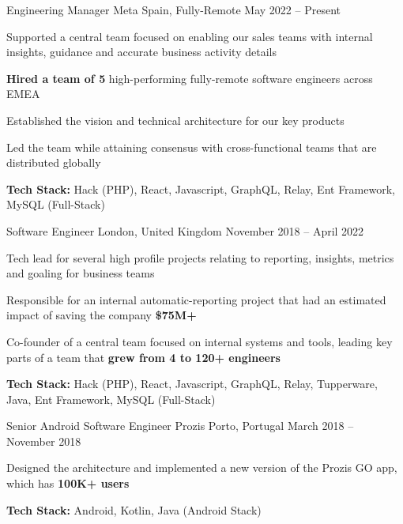 \documentclass[]{awesome-cv}
\begin{document}
	
\vspace{-8mm}
\begin{cventries}

\vspace{-2mm}

\cventry
	{Engineering Manager}
	{Meta}
	{Spain, Fully-Remote}
	{May 2022 – Present}
	{\begin{cvitems}
		\item {Supported a central team focused on enabling our sales teams with internal insights, guidance and accurate business activity details}
		\item {\textbf{Hired a team of 5} high-performing fully-remote software engineers across EMEA}
		\item {Established the vision and technical architecture for our key products}
		\item {Led the team while attaining consensus with cross-functional teams that are distributed globally}
		\item {\textbf{Tech Stack:} Hack (PHP), React, Javascript, GraphQL, Relay, Ent Framework, MySQL (Full-Stack)}
	\end{cvitems}}


	\vspace{-9mm}
	\cventry
	{Software Engineer}
	{}
	{London, United Kingdom}
	{November 2018 – April 2022}
	{\begin{cvitems}
		\item {Tech lead for several high profile projects relating to reporting, insights, metrics and goaling for business teams}
		\item {Responsible for an internal automatic-reporting project that had an estimated impact of saving the company  \textbf{\$75M+}}
		\item {Co-founder of a central team focused on internal systems and tools, leading key parts of a team that \textbf{grew from 4 to 120+ engineers}}
		\item {\textbf{Tech Stack:} Hack (PHP), React, Javascript, GraphQL, Relay, Tupperware, Java, Ent Framework, MySQL  (Full-Stack)}
	\end{cvitems}}

	\vspace{-4mm}
	\cventry
	{Senior Android Software Engineer}
	{Prozis}
	{Porto, Portugal}
	{March 2018 – November 2018}
	{\begin{cvitems}
		\item {Designed the architecture and implemented a new version of the Prozis GO app, which has \textbf{100K+ users}}
		\item {\textbf{Tech Stack:} Android, Kotlin, Java (Android Stack)}
	\end{cvitems}}
	


\end{cventries}
\end{document}
